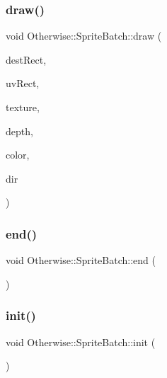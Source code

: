 \subsubsection{\texorpdfstring{draw()}{draw()}\hspace{0.1cm}{\footnotesize\ttfamily [3/3]}}
{\footnotesize\ttfamily void Otherwise\+::\+Sprite\+Batch\+::draw (\begin{DoxyParamCaption}\item[{const glm\+::vec4 \&}]{dest\+Rect,  }\item[{const glm\+::vec4 \&}]{uv\+Rect,  }\item[{G\+Luint}]{texture,  }\item[{float}]{depth,  }\item[{const \hyperlink{struct_otherwise_1_1_color_r_g_b_a8}{Color\+R\+G\+B\+A8} \&}]{color,  }\item[{const glm\+::vec2 \&}]{dir }\end{DoxyParamCaption})}

\mbox{\label{class_otherwise_1_1_sprite_batch_ae4ba15d640dc3f711656bf034065b9c5}} 
\subsubsection{\texorpdfstring{end()}{end()}}
{\footnotesize\ttfamily void Otherwise\+::\+Sprite\+Batch\+::end (\begin{DoxyParamCaption}{ }\end{DoxyParamCaption})}

\mbox{\label{class_otherwise_1_1_sprite_batch_adeef815083edeaaec84849b217c89953}} 
\subsubsection{\texorpdfstring{init()}{init()}}
{\footnotesize\ttfamily void Otherwise\+::\+Sprite\+Batch\+::init (\begin{DoxyParamCaption}{ }\end{DoxyParamCaption})}

\mbox{\label{class_otherwise_1_1_sprite_batch_abad7824a3b0bcf28e41f094b62aa076f}} 
